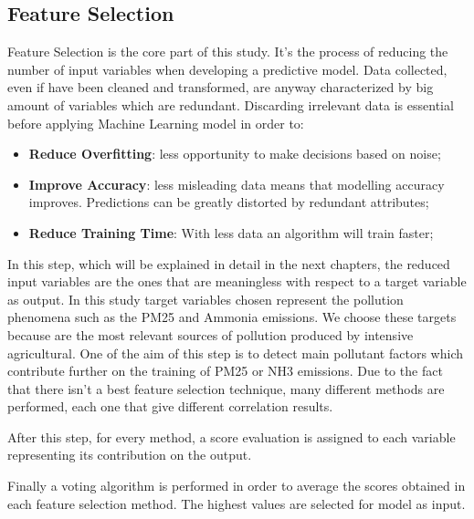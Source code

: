 \subsection{Feature Selection}
Feature Selection is the core part of this study. It's the process of reducing the number of input variables when developing a predictive model. 
Data collected, even if have been cleaned and transformed, are anyway characterized by big amount of variables which are redundant.
Discarding irrelevant data is essential before applying Machine Learning model in order to:
\begin{itemize}
\item \textbf{Reduce Overfitting}: less opportunity to make decisions based on noise;
\item \textbf{Improve Accuracy}: less misleading data means that modelling accuracy improves. Predictions can be greatly distorted by redundant attributes;
\item \textbf{Reduce Training Time}: With less data an algorithm will train faster;
\end{itemize}
In this step, which will be explained in detail in the next chapters, the reduced input variables are the ones that are meaningless with respect to a target variable as output. \newline
In this study target variables chosen represent the pollution phenomena such as the PM25 and Ammonia emissions. We choose these targets because are the most relevant sources of pollution produced by intensive agricultural.\newline
One of the aim of this step is to detect main pollutant factors which contribute further on the training of PM25 or NH3 emissions.
Due to the fact that there isn’t a best feature selection technique, many different methods are performed, each one that give different correlation results.\par
After this step, for every method, a score evaluation is assigned to each variable representing its contribution on the output.\par
Finally a voting algorithm is performed in order to average the scores obtained in each feature selection method. 
The highest values are selected for model as input.
